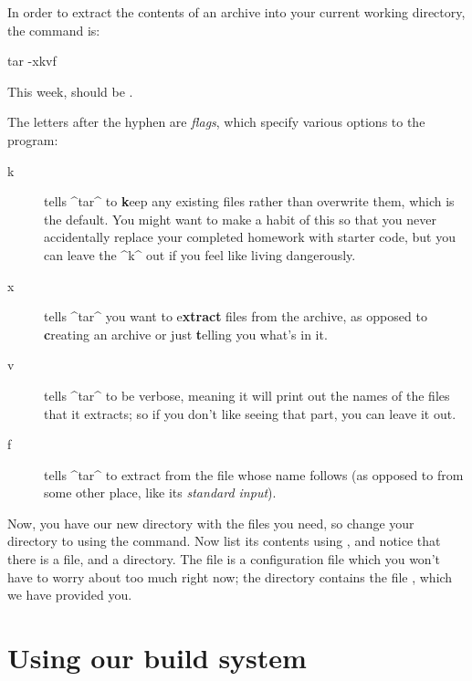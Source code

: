 \documentclass{tufte-handout}
\begin{document}
In order to extract the contents of an archive into your current working
directory, the command is:

\begin{CmdLine*}
  \C tar -xkvf \\
\end{CmdLine*}

\noindent
This week,  should be \texttt{\ThisLabTgz}.

The letters after the hyphen are \emph{flags}, which specify various
options to the program:

\begin{description}

  \item[k] tells ^tar^ to \textbf keep any existing files rather than
    overwrite them, which is the default. You might want to make a habit
    of this so that you never accidentally replace your completed
    homework with starter code, but you can leave the ^k^ out if you
    feel like living dangerously.

  \item[x] tells ^tar^ you want to e\textbf{xtract} files from the
    archive, as opposed to \textbf creating an archive or just \textbf
    telling you what's in it.

  \item[v] tells ^tar^ to be verbose, meaning it will print out the
    names of the files that it extracts; so if you don’t like seeing
    that part, you can leave it out.

  \item[f] tells ^tar^ to extract from the file whose name follows (as
    opposed to from some other place, like its \emph{standard input}).

\end{description}

Now, you have our new directory with the files you need, so change your
directory to  using the  command.
Now list its contents using , and notice that there is a
 file, and a  directory. The
 file is a  configuration file which
you won't have to worry about too much right now; the 
directory contains the file , which we have provided
you.

\section{Using our build system}
\end{document}
